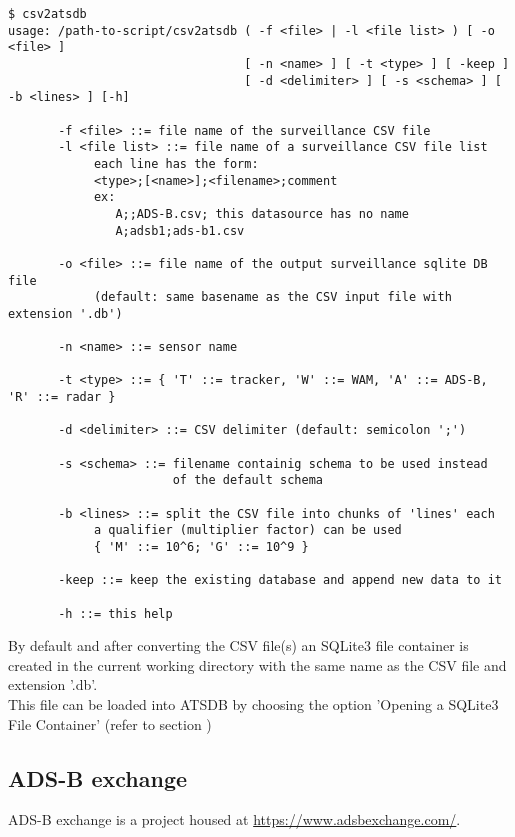 \begin{verbatim}
$ csv2atsdb
usage: /path-to-script/csv2atsdb ( -f <file> | -l <file list> ) [ -o <file> ]
                                 [ -n <name> ] [ -t <type> ] [ -keep ]
                                 [ -d <delimiter> ] [ -s <schema> ] [ -b <lines> ] [-h]

       -f <file> ::= file name of the surveillance CSV file
       -l <file list> ::= file name of a surveillance CSV file list
            each line has the form:
            <type>;[<name>];<filename>;comment
            ex:
               A;;ADS-B.csv; this datasource has no name
               A;adsb1;ads-b1.csv

       -o <file> ::= file name of the output surveillance sqlite DB file
            (default: same basename as the CSV input file with extension '.db')

       -n <name> ::= sensor name

       -t <type> ::= { 'T' ::= tracker, 'W' ::= WAM, 'A' ::= ADS-B, 'R' ::= radar }

       -d <delimiter> ::= CSV delimiter (default: semicolon ';')

       -s <schema> ::= filename containig schema to be used instead
                       of the default schema

       -b <lines> ::= split the CSV file into chunks of 'lines' each
            a qualifier (multiplier factor) can be used
            { 'M' ::= 10^6; 'G' ::= 10^9 }

       -keep ::= keep the existing database and append new data to it

       -h ::= this help
\end{verbatim}

By default and after converting the CSV file(s) an SQLite3 file container is created in the current working directory with the same name as the CSV file and extension '.db'. \\

This file can be loaded into ATSDB by choosing the option 'Opening a SQLite3 File Container' (refer to section )

\subsection{ADS-B exchange}

ADS-B exchange is a project housed at \url{https://www.adsbexchange.com/}. \\

